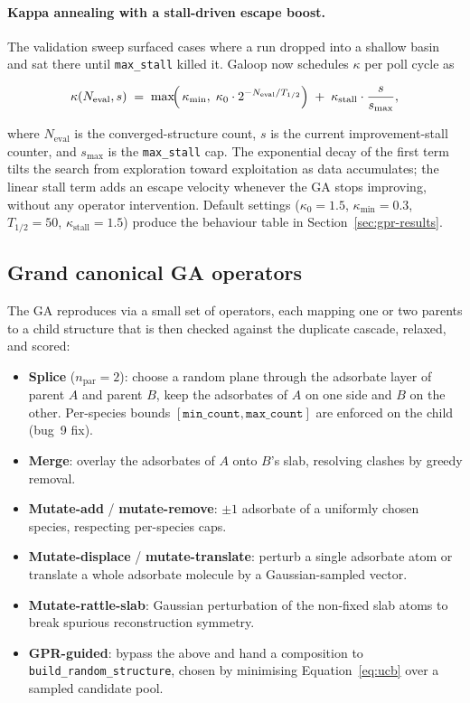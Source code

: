 \documentclass[11pt,letterpaper]{article}
\begin{document}
\paragraph{Kappa annealing with a stall-driven escape boost.}
The validation sweep surfaced cases where a run dropped into a shallow
basin and sat there until \texttt{max\_stall} killed it. Galoop now
schedules $\kappa$ per poll cycle as

\begin{equation}
\label{eq:kappa}
\kappa(N_{\text{eval}}, s)
  \;=\;
  \max\!\Bigl(\,\kappa_{\min},\;
    \kappa_0 \cdot 2^{-N_{\text{eval}} / T_{1/2}}\Bigr)
  \;+\;
  \kappa_{\text{stall}} \cdot \frac{s}{s_{\max}},
\end{equation}

where $N_{\text{eval}}$ is the converged-structure count, $s$ is the
current improvement-stall counter, and $s_{\max}$ is the
\texttt{max\_stall} cap. The exponential decay of the first term
tilts the search from exploration toward exploitation as data
accumulates; the linear stall term adds an escape velocity whenever
the GA stops improving, without any operator intervention. Default
settings ($\kappa_0 = 1.5$, $\kappa_{\min} = 0.3$, $T_{1/2} = 50$,
$\kappa_{\text{stall}} = 1.5$) produce the behaviour table in
Section~\ref{sec:gpr-results}.

\subsection{Grand canonical GA operators}

The GA reproduces via a small set of operators, each mapping one or
two parents to a child structure that is then checked against the
duplicate cascade, relaxed, and scored:

\begin{itemize}
  \item \textbf{Splice} ($n_\text{par}=2$): choose a random plane
    through the adsorbate layer of parent $A$ and parent $B$, keep
    the adsorbates of $A$ on one side and $B$ on the other. Per-species
    bounds $[\texttt{min\_count}, \texttt{max\_count}]$ are enforced
    on the child (bug~9 fix).
  \item \textbf{Merge}: overlay the adsorbates of $A$ onto $B$'s slab,
    resolving clashes by greedy removal.
  \item \textbf{Mutate-add} / \textbf{mutate-remove}: $\pm 1$ adsorbate
    of a uniformly chosen species, respecting per-species caps.
  \item \textbf{Mutate-displace} / \textbf{mutate-translate}: perturb
    a single adsorbate atom or translate a whole adsorbate molecule
    by a Gaussian-sampled vector.
  \item \textbf{Mutate-rattle-slab}: Gaussian perturbation of the
    non-fixed slab atoms to break spurious reconstruction symmetry.
  \item \textbf{GPR-guided}: bypass the above and hand a composition
    to \texttt{build\_random\_structure}, chosen by minimising
    Equation~\ref{eq:ucb} over a sampled candidate pool.
\end{itemize}
\end{document}
